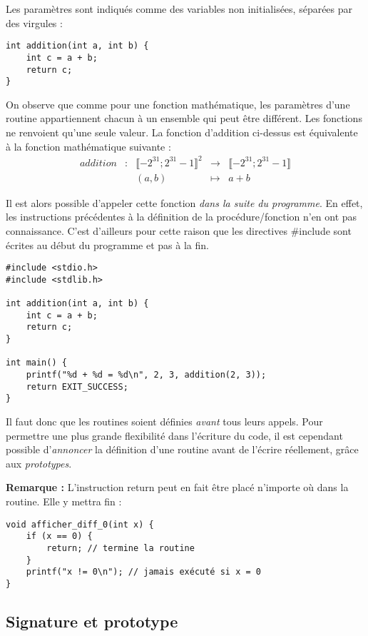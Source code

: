 \documentclass[../../../main.tex]{subfiles}
\begin{document}
Les paramètres sont indiqués comme des variables non initialisées, séparées par des virgules :
\begin{verbatim}
int addition(int a, int b) {
	int c = a + b;
	return c;
}
\end{verbatim}
On observe que comme pour une fonction mathématique, les paramètres d'une routine appartiennent chacun à un ensemble qui peut être différent. Les fonctions ne renvoient qu'une seule valeur. La fonction d'addition ci-dessus est équivalente à la fonction mathématique suivante :
$$
\begin{array}{ccccl}
addition & : & \llbracket{-2^{31}}; 2^{31}-1\rrbracket^{2} & \rightarrow & \llbracket{-2^{31}}; 2^{31}-1\rrbracket \\
 & & (a, b) & \mapsto & a + b
\end{array}
$$

Il est alors possible d'appeler cette fonction \textit{dans la suite du programme}. En effet, les instructions précédentes à la définition de la procédure/fonction n'en ont pas connaissance. C'est d'ailleurs pour cette raison que les directives \textsf{\#include} sont écrites au début du programme et pas à la fin.
\begin{verbatim}
#include <stdio.h>
#include <stdlib.h>

int addition(int a, int b) {
	int c = a + b;
	return c;
}

int main() {
	printf("%d + %d = %d\n", 2, 3, addition(2, 3));
	return EXIT_SUCCESS;
}
\end{verbatim}
Il faut donc que les routines soient définies \textit{avant} tous leurs appels. Pour permettre une plus grande flexibilité dans l'écriture du code, il est cependant possible d'\textit{annoncer} la définition d'une routine avant de l'écrire réellement, grâce aux \textit{prototypes}.
 
\textbf{Remarque :} L'instruction \textsf{return} peut en fait être placé n'importe où dans la routine. Elle y mettra fin :
\begin{verbatim}
void afficher_diff_0(int x) {
	if (x == 0) {
		return; // termine la routine
	}
	printf("x != 0\n"); // jamais exécuté si x = 0
}
\end{verbatim}
\subsection{Signature et prototype}
\label{sub:signature_et_prototype}
\end{document}
